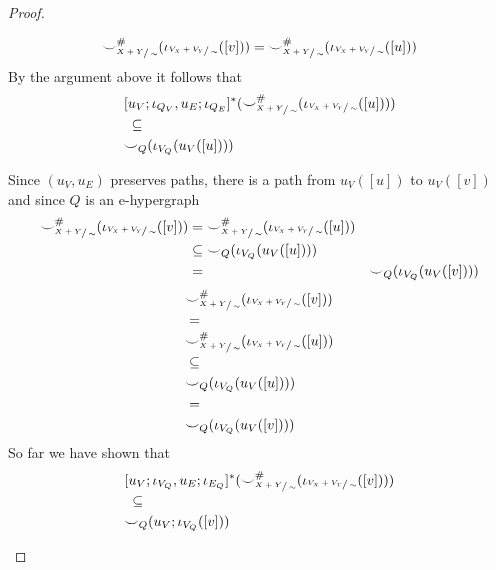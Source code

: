 \begin{proof}
\begin{enumerate}
\begin{itemize}
        \[
            {\smile}_{\sfrac{X+Y}{\sim}}^{{\#}}(\iota_{\sfrac{V_{X} + V_{Y}}{\sim}}([v])) = {\smile}_{\sfrac{X+Y}{\sim}}^{{\#}}(\iota_{\sfrac{V_{X} + V_{Y}}{\sim}}([u]))    
        \]
        By the argument above it follows that
        \begin{align*}
            &[u_{V};\iota_{Q_{V}},u_{E};\iota_{Q_{E}}]^{*}({\smile}_{\sfrac{X+Y}{\sim}}^{{\#}}(\iota_{\sfrac{V_{X} + V_{Y}}{\sim}}([u])))\\
            &\;\subseteq\\
            &{\smile}_{Q}(\iota_{V_{Q}}(u_{V}([u])))
        \end{align*}
        \end{itemize}
       Since $(u_{V},u_{E})$ preserves paths, there is a path from $u_{V}([u])$ to $u_{V}([v])$ and since $Q$ is an e-hypergraph
       \ifdefined \ONECOLUMN
       \begin{align*}
        {\smile}_{\sfrac{X+Y}{\sim}}^{{\#}}(\iota_{\sfrac{V_{X} + V_{Y}}{\sim}}([v]))
        &=
        {\smile}_{\sfrac{X+Y}{\sim}}^{{\#}}(\iota_{\sfrac{V_{X} + V_{Y}}{\sim}}([u]))\\
        &\subseteq
        {\smile}_{Q}(\iota_{V_{Q}}(u_{V}([u])))\\
        &=
        &{\smile}_{Q}(\iota_{V_{Q}}(u_{V}([v])))
       \end{align*}
       \else
       \begin{align*}
        &{\smile}_{\sfrac{X+Y}{\sim}}^{{\#}}(\iota_{\sfrac{V_{X} + V_{Y}}{\sim}}([v]))\\
        &=\\
        &{\smile}_{\sfrac{X+Y}{\sim}}^{{\#}}(\iota_{\sfrac{V_{X} + V_{Y}}{\sim}}([u]))\\
        &\subseteq\\
        &{\smile}_{Q}(\iota_{V_{Q}}(u_{V}([u])))\\
        &=\\
        &{\smile}_{Q}(\iota_{V_{Q}}(u_{V}([v])))
    \end{align*}
    \fi
       So far we have shown that
       \begin{align*}
        &[u_{V};\iota_{V_{Q}}, u_{E};\iota_{E_{Q}}]^{*}({\smile}_{\sfrac{X+Y}{\sim}}^{{\#}}(\iota_{\sfrac{V_{X} + V_{Y}}{\sim}}([v])))\\
        &\;\subseteq\\
        & {\smile}_{Q}(u_{V};\iota_{V_{Q}}([v]))
       \end{align*}

\end{enumerate}
\end{proof}
